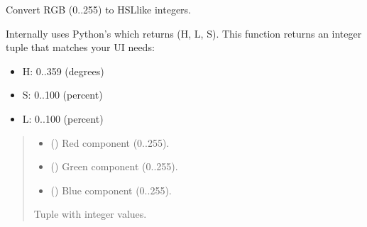 \documentclass[letterpaper,10pt,english]{sphinxmanual}
\begin{document}
\begin{fulllineitems}
\label{\detokenize{api/colors:colors.rgb_to_hsl}}
\pysigstartsignatures
\pysiglinewithargsret
{}
{\sphinxparamcomma {}\sphinxparamcomma {}}
{}
\pysigstopsignatures
\sphinxAtStartPar
Convert RGB (0..255) to HSL\sphinxhyphen{}like integers.

\sphinxAtStartPar
Internally uses Python’s  which returns (H, L, S).
This function returns an integer tuple that matches your UI needs:
\begin{itemize}
\item {} 
\sphinxAtStartPar
H: 0..359 (degrees)

\item {} 
\sphinxAtStartPar
S: 0..100 (percent)

\item {} 
\sphinxAtStartPar
L: 0..100 (percent)

\end{itemize}
\begin{quote}\begin{description}
\begin{itemize}
\item {} 
\sphinxAtStartPar
{} () \textendash{} Red component (0..255).

\item {} 
\sphinxAtStartPar
{} () \textendash{} Green component (0..255).

\item {} 
\sphinxAtStartPar
{} () \textendash{} Blue component (0..255).

\end{itemize}

\sphinxAtStartPar
{}

\sphinxAtStartPar
Tuple  with integer values.

\end{description}\end{quote}

\end{fulllineitems}
\end{document}
